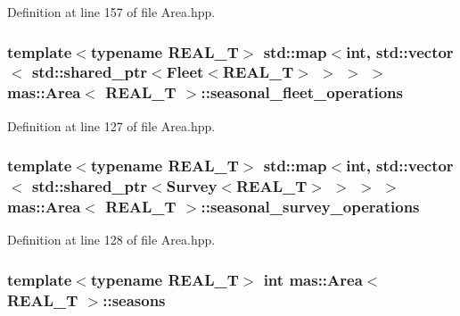 Definition at line 157 of file Area.\-hpp.

\hypertarget{structmas_1_1_area_ac0d892bff62ae6d168ae9161f5db7cf2}{
\subsubsection[{seasonal\-\_\-fleet\-\_\-operations}]{\setlength{\rightskip}{0pt plus 5cm}template$<$typename R\-E\-A\-L\-\_\-\-T$>$ std\-::map$<$int, std\-::vector$<$ std\-::shared\-\_\-ptr$<${\bf Fleet}$<$R\-E\-A\-L\-\_\-\-T$>$ $>$ $>$ $>$ {\bf mas\-::\-Area}$<$ R\-E\-A\-L\-\_\-\-T $>$\-::seasonal\-\_\-fleet\-\_\-operations}}\label{structmas_1_1_area_ac0d892bff62ae6d168ae9161f5db7cf2}


Definition at line 127 of file Area.\-hpp.

\hypertarget{structmas_1_1_area_a513c4bf4e2a1fdd3c63f1bac10e25bc5}{
\subsubsection[{seasonal\-\_\-survey\-\_\-operations}]{\setlength{\rightskip}{0pt plus 5cm}template$<$typename R\-E\-A\-L\-\_\-\-T$>$ std\-::map$<$int, std\-::vector$<$ std\-::shared\-\_\-ptr$<${\bf Survey}$<$R\-E\-A\-L\-\_\-\-T$>$ $>$ $>$ $>$ {\bf mas\-::\-Area}$<$ R\-E\-A\-L\-\_\-\-T $>$\-::seasonal\-\_\-survey\-\_\-operations}}\label{structmas_1_1_area_a513c4bf4e2a1fdd3c63f1bac10e25bc5}


Definition at line 128 of file Area.\-hpp.

\hypertarget{structmas_1_1_area_a45d133239182e8d71e2fd4d1ed1ba04f}{
\subsubsection[{seasons}]{\setlength{\rightskip}{0pt plus 5cm}template$<$typename R\-E\-A\-L\-\_\-\-T$>$ int {\bf mas\-::\-Area}$<$ R\-E\-A\-L\-\_\-\-T $>$\-::seasons}}\label{structmas_1_1_area_a45d133239182e8d71e2fd4d1ed1ba04f}


